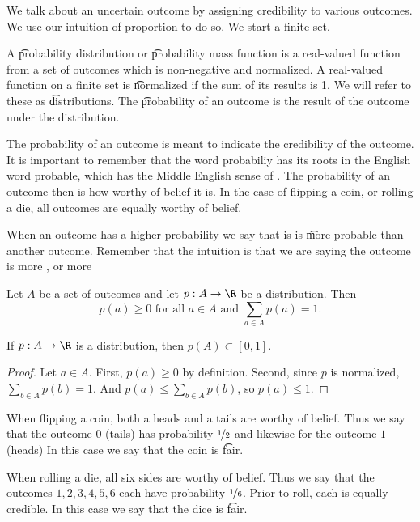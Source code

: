 

We talk about an uncertain outcome by assigning credibility to various outcomes.
We use our intuition of proportion to do so.
We start a finite set.


A \t{probability distribution} or \t{probability mass function} is a real-valued function from a set of outcomes which is non-negative and normalized.
A real-valued function on a finite set is \t{normalized} if the sum of its results is 1.
We will refer to these as \t{distributions}.
The \t{probability of an outcome} is the result of the outcome under the distribution.

The probability of an outcome is meant to indicate the credibility of the outcome.
It is important to remember that the word probabiliy has its roots in the English word probable, which has the Middle English sense of .
The probability of an outcome then is how worthy of belief it is.
In the case of flipping a coin, or rolling a die, all outcomes are equally worthy of belief.

When an outcome has a higher probability we say that is is \t{more probable} than another outcome.
Remember that the intuition is that we are saying the outcome is more , or more 


Let $A$ be a set of outcomes and let $p: A \to \R$ be a distribution.
Then
\[
  p(a) \geq 0 \text{ for all } a \in A \text{ and } \sum_{a \in A} p(a) = 1.
\]

\begin{prop}
If $p: A \to \R$ is a distribution, then $p(A) \subset [0, 1]$.
\begin{proof}

Let $a \in A$.
First, $p(a) \geq 0$ by definition.
Second, since $p$ is normalized, $\sum_{b \in A} p(b) = 1$.
And $p(a) \leq \sum_{b \in A} p(b)$, so $p(a) \leq 1$.

\end{proof}

\end{prop}

When flipping a coin, both a heads and a tails are worthy of belief.
Thus we say that the outcome $0$ (tails) has probability $\nicefrac{1}{2}$ and likewise for the outcome $1$ (heads)
In this case we say that the coin is \t{fair}.

When rolling a die, all six sides are worthy of belief.
Thus we say that the outcomes $1, 2, 3, 4, 5, 6$ each have probability $\nicefrac{1}{6}$.
Prior to roll, each is equally credible.
In this case we say that the dice is \t{fair}.
